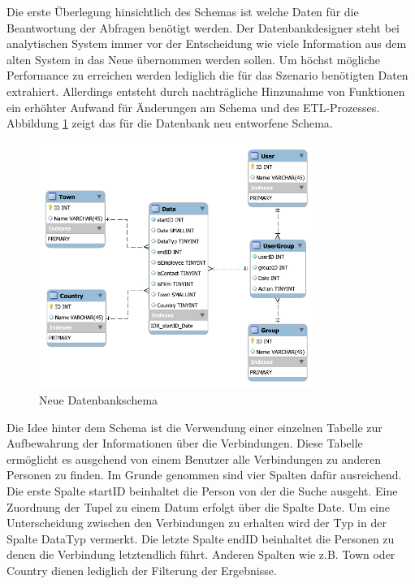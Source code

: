 Die erste Überlegung hinsichtlich des Schemas ist welche Daten für die Beantwortung der Abfragen benötigt werden. Der Datenbankdesigner steht bei analytischen System immer vor der Entscheidung wie viele Information aus dem alten System in das Neue übernommen werden sollen. Um höchst mögliche Performance zu erreichen werden lediglich die für das Szenario benötigten Daten extrahiert. Allerdings entsteht durch nachträgliche Hinzunahme von Funktionen ein erhöhter Aufwand für Änderungen am Schema und des ETL-Prozesses. Abbildung \ref{konzept_SchemaNeu} zeigt das für die Datenbank neu entworfene Schema. 

\begin{figure}[htbp]
\centering
  \includegraphics[width=0.8\textwidth, width=0.8\textwidth]{pics/NewSchema.pdf}
\caption{Neue Datenbankschema}
\label{konzept_SchemaNeu}
\end{figure} 

Die Idee hinter dem Schema ist die Verwendung einer einzelnen Tabelle zur Aufbewahrung der Informationen über die Verbindungen. Diese Tabelle  ermöglicht es ausgehend von einem Benutzer alle Verbindungen zu anderen Personen zu finden. Im Grunde genommen sind vier Spalten dafür ausreichend. Die erste Spalte startID beinhaltet die Person von der die Suche ausgeht. Eine Zuordnung der Tupel zu einem Datum erfolgt über die Spalte Date. Um eine Unterscheidung zwischen den Verbindungen zu erhalten wird der Typ in der Spalte DataTyp vermerkt. Die letzte Spalte endID beinhaltet die Personen zu denen die Verbindung letztendlich führt. Anderen Spalten wie z.B. Town oder Country dienen lediglich der Filterung der Ergebnisse.

